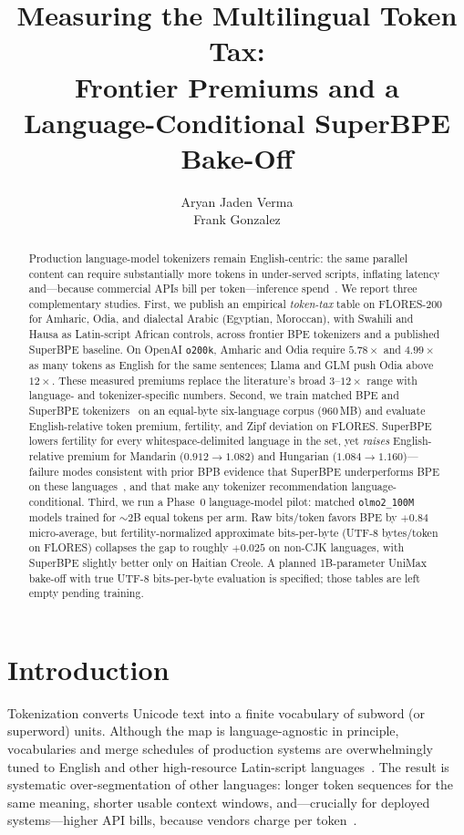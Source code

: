 \documentclass[11pt,a4paper]{article}
\title{Measuring the Multilingual Token Tax:\\
Frontier Premiums and a Language-Conditional SuperBPE Bake-Off}
\author{
Aryan Jaden Verma\\
Frank Gonzalez
}
\date{}
\begin{document}
\maketitle

\begin{abstract}
Production language-model tokenizers remain English-centric: the same parallel content can require substantially more tokens in under-served scripts, inflating latency and---because commercial APIs bill per token---inference spend~\citep{petrov2023unfairness,ahia2023cost}.
We report three complementary studies.
First, we publish an empirical \emph{token-tax} table on FLORES-200 for Amharic, Odia, and dialectal Arabic (Egyptian, Moroccan), with Swahili and Hausa as Latin-script African controls, across frontier BPE tokenizers and a published SuperBPE baseline.
On OpenAI \texttt{o200k}, Amharic and Odia require $5.78\times$ and $4.99\times$ as many tokens as English for the same sentences; Llama and GLM push Odia above $12\times$.
These measured premiums replace the literature's broad $3$--$12\times$ range with language- and tokenizer-specific numbers.
Second, we train matched BPE and SuperBPE tokenizers~\citep{liu2025superbpe} on an equal-byte six-language corpus (960\,MB) and evaluate English-relative token premium, fertility, and Zipf deviation on FLORES.
SuperBPE lowers fertility for every whitespace-delimited language in the set, yet \emph{raises} English-relative premium for Mandarin ($0.912\to 1.082$) and Hungarian ($1.084\to 1.160$)---failure modes consistent with prior BPB evidence that SuperBPE underperforms BPE on these languages~\citep{chowdhury-woolf-2026-benchmarking}, and that make any tokenizer recommendation language-conditional.
Third, we run a Phase~0 language-model pilot: matched \texttt{olmo2\_100M} models trained for $\sim$2B equal tokens per arm.
Raw bits/token favors BPE by $+0.84$ micro-average, but fertility-normalized approximate bits-per-byte (UTF-8 bytes/token on FLORES) collapses the gap to roughly $+0.025$ on non-CJK languages, with SuperBPE slightly better only on Haitian Creole.
A planned 1B-parameter UniMax bake-off with true UTF-8 bits-per-byte evaluation is specified; those tables are left empty pending training.
\end{abstract}

\section{Introduction}
\label{sec:intro}

Tokenization converts Unicode text into a finite vocabulary of subword (or superword) units.
Although the map is language-agnostic in principle, vocabularies and merge schedules of production systems are overwhelmingly tuned to English and other high-resource Latin-script languages~\citep{petrov2023unfairness,arnett2025inequities}.
The result is systematic over-segmentation of other languages: longer token sequences for the same meaning, shorter usable context windows, and---crucially for deployed systems---higher API bills, because vendors charge per token~\citep{ahia2023cost}.
\end{document}
